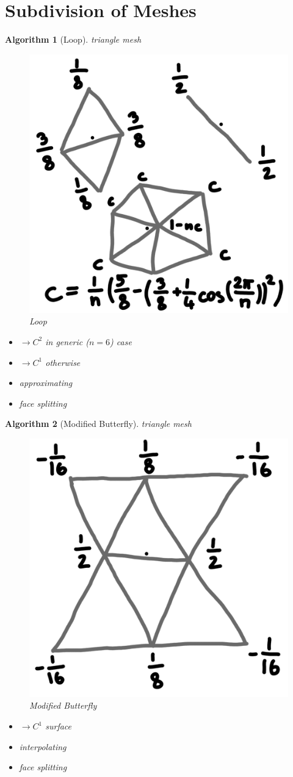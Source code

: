 \documentclass[conference]{IEEEtran}
\newtheorem{algorithm}{Algorithm}
\begin{document}
\section{Subdivision of Meshes}

\begin{algorithm}[Loop]
	triangle mesh
	
	\begin{figure}[h!]
		\centering
		\includegraphics[width=0.5\linewidth]{figures/loop_short}
		\caption{Loop}
	\end{figure}
	
	\begin{itemize}
		\item $\rightarrow C^2$ in generic ($n=6$) case
		\item $\rightarrow C^1$ otherwise
		\item approximating
		\item face splitting
	\end{itemize}
\end{algorithm}

\begin{algorithm}[Modified Butterfly]
	triangle mesh
	
	\begin{figure}[h!]
		\centering
		\includegraphics[width=0.5\linewidth]{figures/modified_butterfly_short}
		\caption{Modified Butterfly}
	\end{figure}
	
	\begin{itemize}
		\item $\rightarrow C^1$ surface
		\item interpolating
		\item face splitting
	\end{itemize}
\end{algorithm}
\end{document}
